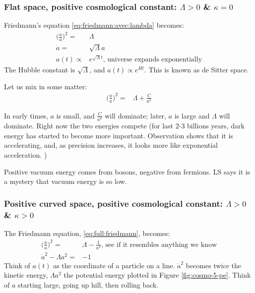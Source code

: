 \documentclass[]{article}
\begin{document}
\subsubsection{Flat space, positive cosmological constant: $\Lambda>0$ \& $\kappa=0$}\label{sec:lambda:pos:k:0}

Friedmann's equation \eqref{eq:friedmann:avec:lambda} becomes:
\begin{align*}
	\big(\frac{\dot{a}}{a}\big)^2  =& \Lambda\\ 
	\dot{a} =& \sqrt{\Lambda} a\\
	a(t) \propto& e^{\sqrt{\Lambda}t} \text{, universe expands exponentially}
\end{align*}
 The Hubble constant is $\sqrt{\Lambda}$, and $
 a(t) \propto e^{Ht}$. This is known as de Sitter space.
 
 Let us mix in some matter:
 \begin{align*}
 	\big(\frac{\dot{a}}{a}\big)^2  =& \Lambda + \frac{C}{a^3}
 \end{align*}
 
 In early times, $a$ is small, and $\frac{C}{a^3}$ will dominate; later, $a$ is large and $\Lambda$ will dominate. Right now the two energies compete (for last 2-3 billions years, dark energy has started to become more important. Observation shows that it is accelerating, and, as precision increases, it looks more like exponential acceleration. )
 
 Positive vacuum energy comes from bosons, negative from fermions. LS says it is a mystery that vacuum energy is so low.
 
 \subsubsection{Positive curved space, positive cosmological constant: $\Lambda>0$ \& $\kappa>0$}\label{sec:lambda:pos:k:1}
 
 The Friedmann equation, \eqref{eq:full:friedmann}, becomes:
 \begin{align*}
 	\big(\frac{\dot{a}}{a}\big)^2  =& \Lambda - \frac{1}{a^2} \text{, see if it resembles anything we know}\\
 	\dot{a}^2 - \Lambda a^2 =&-1
 \end{align*}
 Think of $a(t)$ as the coordinate of a particle on a line. $\dot{a}^2$ becomes twice the kinetic energy, $\Lambda a^2$ the potential energy plotted in Figure \ref{fig:cosmo-5-pe}. Think of $a$ starting large, going up hill, then rolling back. 
 
\end{document}
